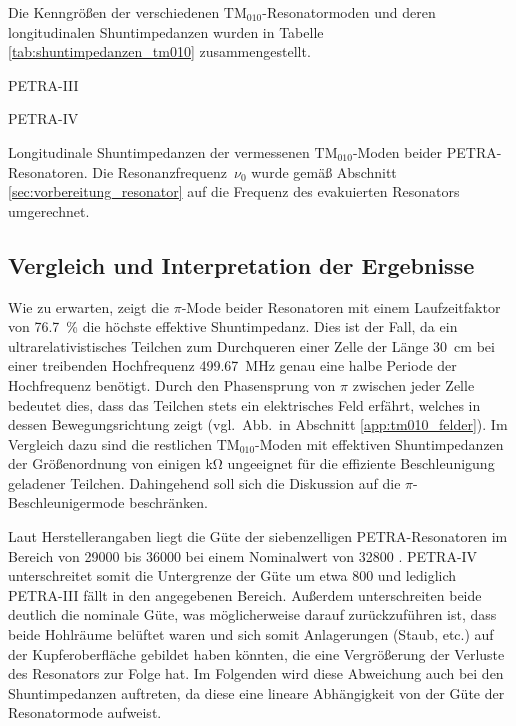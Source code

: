 Die Kenngrößen der verschiedenen $\mathrm{TM}_{010}$-Resonatormoden und deren longitudinalen Shuntimpedanzen wurden in Tabelle \ref{tab:shuntimpedanzen_tm010} zusammengestellt.
\begin{table}[htb]
	\begin{subtable}{1\textwidth}
		\centering
		
		\caption{PETRA-III}
	\end{subtable}
	\begin{subtable}{1\textwidth}
		\centering
		
		\caption{PETRA-IV}
	\end{subtable}
	\caption{Longitudinale Shuntimpedanzen der vermessenen $\mathrm{TM}_{010}$-Moden beider PETRA-Resonatoren. Die Resonanzfrequenz~$\nu_0$ wurde gemäß Abschnitt \ref{sec:vorbereitung_resonator} auf die Frequenz des evakuierten Resonators umgerechnet. }
	\label{tab:shuntimpedanzen_tm010}
\end{table}

\subsection{Vergleich und Interpretation der Ergebnisse}
Wie zu erwarten, zeigt die $\pi$-Mode beider Resonatoren mit einem Laufzeitfaktor von \SI{76,7}{\percent} die höchste effektive Shuntimpedanz.
Dies ist der Fall, da ein ultrarelativistisches Teilchen zum Durchqueren einer Zelle der Länge \SI{30}{\centi\metre} bei einer treibenden Hochfrequenz \SI{499.67}{MHz} genau eine halbe Periode der Hochfrequenz benötigt.
Durch den Phasensprung von $\pi$ zwischen jeder Zelle bedeutet dies, dass das Teilchen stets ein elektrisches Feld erfährt, welches in dessen Bewegungsrichtung zeigt (vgl.\ Abb.\ in Abschnitt \ref{app:tm010_felder}).
Im Vergleich dazu sind die restlichen $\mathrm{TM}_{010}$-Moden mit effektiven Shuntimpedanzen der Größenordnung von einigen \si{\kilo\ohm} ungeeignet für die effiziente Beschleunigung geladener Teilchen.
Dahingehend soll sich die Diskussion auf die $\pi$-Beschleunigermode beschränken.

Laut Herstellerangaben liegt die Güte der siebenzelligen PETRA-Resonatoren im Bereich von \num{29000} bis \num{36000} bei einem Nominalwert von \num{32800} \cite{desy_petra}.
PETRA-IV unterschreitet somit die Untergrenze der Güte um etwa \num{800} und lediglich PETRA-III fällt in den angegebenen Bereich.
Außerdem unterschreiten beide deutlich die nominale Güte, was möglicherweise darauf zurückzuführen ist, dass beide Hohlräume belüftet waren und sich somit Anlagerungen (Staub, etc.) auf der Kupferoberfläche gebildet haben könnten, die eine Vergrößerung der Verluste des Resonators zur Folge hat.
Im Folgenden wird diese Abweichung auch bei den Shuntimpedanzen auftreten, da diese eine lineare Abhängigkeit von der Güte der Resonatormode aufweist.

